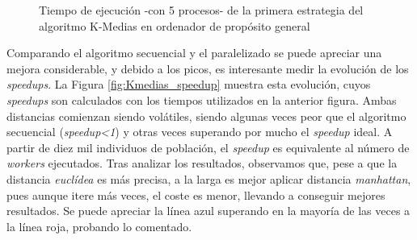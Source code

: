 	
			\begin{figure}[!h]
			\centering
			\caption{Tiempo de ejecución -con 5 procesos- de la primera estrategia del algoritmo K-Medias en ordenador de propósito general}
			\label{fig:KMedias}
			\end{figure}
			
			
			Comparando el algoritmo secuencial y el paralelizado se puede apreciar una mejora considerable, y debido a los picos, es interesante medir la evolución de los \textit{speedups}. La Figura \ref{fig:Kmedias_speedup} muestra esta evolución, cuyos \textit{speedups} son calculados con los tiempos utilizados en la anterior figura. Ambas distancias comienzan siendo volátiles, siendo algunas veces peor que el algoritmo secuencial (\textit{speedup<1}) y otras veces superando por mucho el \textit{speedup} ideal. A partir de diez mil individuos de población, el \textit{speedup} es equivalente al número de \textit{workers} ejecutados. Tras analizar los resultados, observamos que, pese a que la distancia \textit{euclídea} es más precisa, a la larga es mejor aplicar distancia \textit{manhattan}, pues aunque itere más veces, el coste es menor, llevando a conseguir mejores resultados. Se puede apreciar la línea azul superando en la mayoría de las veces a la línea roja, probando lo comentado.
			
